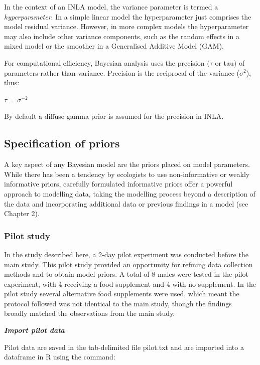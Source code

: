 \documentclass[
]{book}
\begin{document}
In the context of an INLA model, the variance parameter is termed a \emph{hyperparameter}. In a simple linear model the hyperparameter just comprises the model residual variance. However, in more complex models the hyperparameter may also include other variance components, such as the random effects in a mixed model or the smoother in a Generalised Additive Model (GAM).

For computational efficiency, Bayesian analysis uses the precision (\(\tau\) or tau) of parameters rather than variance. Precision is the reciprocal of the variance (\(\sigma^{2}\)), thus:

\(\tau\) = \(\sigma^{-2}\)

By default a diffuse gamma prior is assumed for the precision in INLA.

\hypertarget{specification-of-priors}{%
\subsection{Specification of priors}\label{specification-of-priors}}

A key aspect of any Bayesian model are the priors placed on model parameters. While there has been a tendency by ecologists to use non-informative or weakly informative priors, carefully formulated informative priors offer a powerful approach to modelling data, taking the modelling process beyond a description of the data and incorporating additional data or previous findings in a model (see Chapter 2).

\hypertarget{pilot}{%
\subsubsection{Pilot study}\label{pilot}}

In the study described here, a 2-day pilot experiment was conducted before the main study. This pilot study provided an opportunity for refining data collection methods and to obtain model priors. A total of 8 males were tested in the pilot experiment, with 4 receiving a food supplement and 4 with no supplement. In the pilot study several alternative food supplements were used, which meant the protocol followed was not identical to the main study, though the findings broadly matched the observations from the main study.

\emph{\textbf{Import pilot data}}

Pilot data are saved in the tab-delimited file pilot.txt and are imported into a dataframe in R using the command:
\end{document}
